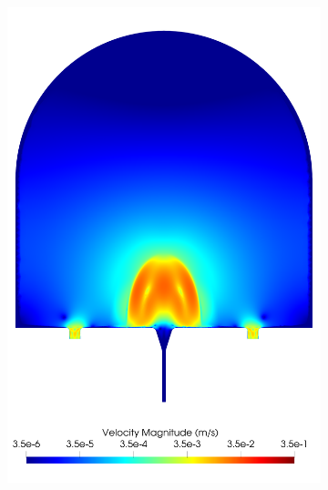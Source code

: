 \begin{figure}
\begin{subfigure}[b]{0.3\textwidth}
            \includegraphics[width=\textwidth]{diagrams/results-modelling/velocity-comparison/meshandsoln_dg_velocity_placentone_34_velocity-log.png}
            \caption{}
            \label{fig:4-models-placentone-norm-log:34}
        \end{subfigure}
        \begin{subfigure}[b]{0.3\textwidth}
            \centering

\end{subfigure}
\end{figure}
